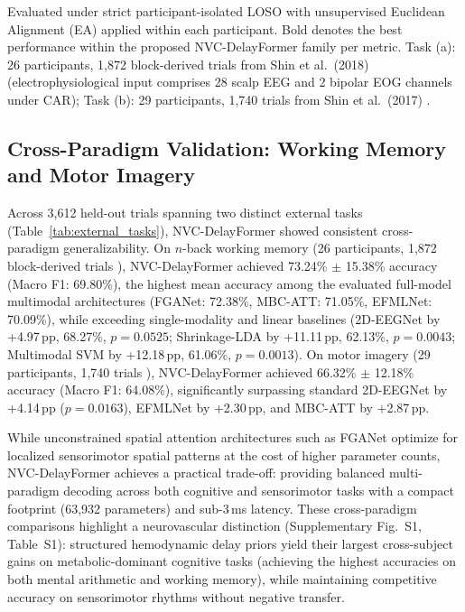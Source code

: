 \documentclass[journal]{IEEEtran}
\begin{document}
\begin{table}[!t]
{\begin{tabular}{lcccc}
\bottomrule
\end{tabular}}
\par\smallskip
{\scriptsize Evaluated under strict participant-isolated LOSO with unsupervised Euclidean Alignment (EA) applied within each participant. Bold denotes the best performance within the proposed NVC-DelayFormer family per metric. Task (a): 26 participants, 1,872 block-derived trials from Shin et al.\ (2018) \cite{shin2018simultaneous} (electrophysiological input comprises 28 scalp EEG and 2 bipolar EOG channels under CAR); Task (b): 29 participants, 1,740 trials from Shin et al.\ (2017) \cite{shin2017open}.}
\end{table}


\subsection{Cross-Paradigm Validation: Working Memory and Motor Imagery}
\label{sec:external_eval}
Across 3,612 held-out trials spanning two distinct external tasks (Table~\ref{tab:external_tasks}), NVC-DelayFormer showed consistent cross-paradigm generalizability. On $n$-back working memory (26 participants, 1,872 block-derived trials \cite{shin2018simultaneous}), NVC-DelayFormer achieved 73.24\% $\pm$ 15.38\% accuracy (Macro F1: 69.80\%), the highest mean accuracy among the evaluated full-model multimodal architectures (FGANet: 72.38\%, MBC-ATT: 71.05\%, EFMLNet: 70.09\%), while exceeding single-modality and linear baselines (2D-EEGNet by +4.97\,pp, 68.27\%, $p = 0.0525$; Shrinkage-LDA by +11.11\,pp, 62.13\%, $p = 0.0043$; Multimodal SVM by +12.18\,pp, 61.06\%, $p = 0.0013$). On motor imagery (29 participants, 1,740 trials \cite{shin2017open}), NVC-DelayFormer achieved 66.32\% $\pm$ 12.18\% accuracy (Macro F1: 64.08\%), significantly surpassing standard 2D-EEGNet by +4.14\,pp ($p = 0.0163$), EFMLNet by +2.30\,pp, and MBC-ATT by +2.87\,pp.

While unconstrained spatial attention architectures such as FGANet optimize for localized sensorimotor spatial patterns at the cost of higher parameter counts, NVC-DelayFormer achieves a practical trade-off: providing balanced multi-paradigm decoding across both cognitive and sensorimotor tasks with a compact footprint (63,932 parameters) and sub-3\,ms latency. These cross-paradigm comparisons highlight a neurovascular distinction (Supplementary Fig.~S1, Table~S1): structured hemodynamic delay priors yield their largest cross-subject gains on metabolic-dominant cognitive tasks (achieving the highest accuracies on both mental arithmetic and working memory), while maintaining competitive accuracy on sensorimotor rhythms without negative transfer.
\end{document}
